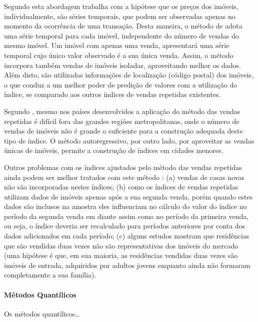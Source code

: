 \documentclass[
	12pt,				%
	oneside,			%
	a4paper,			%
	chapter=TITLE,		%
	section=TITLE,		%
	english,			%
	brazil				%
	]{abntex2}
\begin{document}
\begin{refsection}
Segundo \textcite{nagaraja2014} esta abordagem trabalha com a hipótese que os preços dos
imóveis, individualmente, são séries temporais, que podem ser observadas apenas
no momento da ocorrência de uma transação. Desta maneira, o método de
\textcite{nagaraja2011} adota uma série temporal para cada imóvel, independente do número
de vendas do mesmo imóvel. Um imóvel com apenas uma venda, apresentará uma
série temporal cujo único valor observado é a sua única venda. Assim, o método
incorpora também vendas de imóveis isoladas, aproveitando melhor os dados.
Além disto, são utilizadas informações de localização (código postal) dos
imóveis, o que conduz a um melhor poder de predição de valores com a utilização
do índice, se comparado aos outros índices de vendas repetidas existentes.

Segundo \textcite{nagaraja2011}, mesmo nos países desenvolvidos a aplicação do método das
vendas repetidas é difícil fora das grandes regiões metropolitanas, onde o
número de vendas de imóveis não é grande o suficiente para a construção adequada
deste tipo de índice. O método autoregressivo, por outro lado, por aproveitar
as vendas únicas de imóveis, permite a construção de índices em cidades menores.

Outros problemas com os índices ajustados pelo método das vendas repetidas ainda
podem ser melhor tratados com este método \autocite[p.~5-7]{nagaraja2011}: (a) vendas de
casas novas não são incorporadas nestes índices; (b) como os índices de vendas
repetidas utilizam dados de imóveis apenas após a sua segunda venda, porém
quando estes dados são inclusos na amostra eles influenciam no cálculo do valor
do índice no período da segunda venda em diante assim como no período da
primeira venda, ou seja, o índice deveria ser recalculado para períodos
anteriores por conta dos dados adicionados em cada período; (c) alguns estudos
mostram que residências que são vendidas duas vezes não são representativas dos
imóveis do mercado (uma hipótese é que, em sua maioria, as residências vendidas
duas vezes são imóveis de entrada, adquiridos por adultos jovens enquanto ainda
não formaram completamente a sua família).

\hypertarget{muxe9todos-quantuxedlicos}{%
\paragraph{Métodos Quantílicos}\label{muxe9todos-quantuxedlicos}}

Os métodos quantílicos\ldots{}


\end{refsection}
\end{document}
